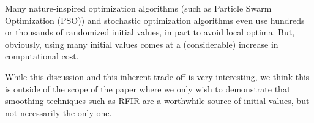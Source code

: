 Many nature-inspired optimization algorithms (such as Particle Swarm Optimization (PSO)) and stochastic optimization algorithms even use hundreds or thousands of randomized initial values, in part to avoid local optima.
But, obviously, using many initial values comes at a (considerable) increase in computational cost.

While this discussion and this inherent trade-off is very interesting, we think this is outside of the scope of the paper where we only wish to demonstrate that smoothing techniques such as RFIR are a worthwhile source of initial values, but not necessarily the only one.
